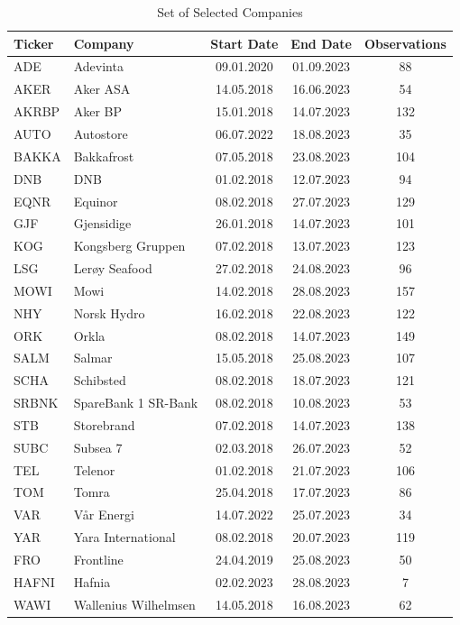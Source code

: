 \begin{table}[H]
    \centering
    \small %
    \begin{tabular*}{\textwidth}{@{\extracolsep{\fill}}llccc}
    \toprule
        \textbf{Ticker} & \textbf{Company} & \textbf{Start Date} & \textbf{End Date} & \textbf{Observations} \\ 
      \hline
    ADE & Adevinta & 09.01.2020 & 01.09.2023 &  88 \\ 
      AKER & Aker ASA & 14.05.2018 & 16.06.2023 &  54 \\ 
      AKRBP & Aker BP & 15.01.2018 & 14.07.2023 & 132 \\ 
      AUTO & Autostore & 06.07.2022 & 18.08.2023 &  35 \\ 
      BAKKA & Bakkafrost & 07.05.2018 & 23.08.2023 & 104 \\ 
      DNB & DNB & 01.02.2018 & 12.07.2023 &  94 \\ 
      EQNR & Equinor & 08.02.2018 & 27.07.2023 & 129 \\ 
      GJF & Gjensidige & 26.01.2018 & 14.07.2023 &  101 \\ 
      KOG & Kongsberg Gruppen & 07.02.2018 & 13.07.2023 & 123 \\ 
      LSG & Lerøy Seafood & 27.02.2018 & 24.08.2023 &  96 \\ 
      MOWI & Mowi & 14.02.2018 & 28.08.2023 & 157 \\ 
      NHY & Norsk Hydro & 16.02.2018 & 22.08.2023 & 122 \\ 
      ORK & Orkla & 08.02.2018 & 14.07.2023 & 149 \\ 
      SALM & Salmar & 15.05.2018 & 25.08.2023 & 107 \\ 
      SCHA & Schibsted & 08.02.2018 & 18.07.2023 & 121 \\ 
      SRBNK & SpareBank 1 SR-Bank & 08.02.2018 & 10.08.2023 &  53 \\ 
      STB & Storebrand & 07.02.2018 & 14.07.2023 & 138 \\ 
      SUBC & Subsea 7 & 02.03.2018 & 26.07.2023 &  52 \\ 
      TEL & Telenor & 01.02.2018 & 21.07.2023 & 106 \\ 
      TOM & Tomra & 25.04.2018 & 17.07.2023 &  86 \\ 
      VAR & Vår Energi & 14.07.2022 & 25.07.2023 &  34 \\ 
      YAR & Yara International & 08.02.2018 & 20.07.2023 & 119 \\ 
      FRO & Frontline & 24.04.2019 & 25.08.2023 &  50 \\ 
      HAFNI & Hafnia & 02.02.2023 & 28.08.2023 &   7 \\ 
      WAWI & Wallenius Wilhelmsen & 14.05.2018 & 16.08.2023 &  62 \\ 
        \bottomrule
        \end{tabular*}
    \caption{Set of Selected Companies}
    \label{tab:selected_companies}
\end{table}

